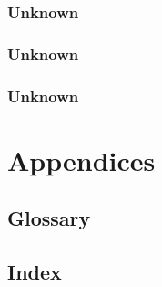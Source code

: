\subsection{Unknown}
\subsection{Unknown}
\subsection{Unknown}

\chapter{Appendices}
\label{ch:apdx}
\section{Glossary}
\section{Index}